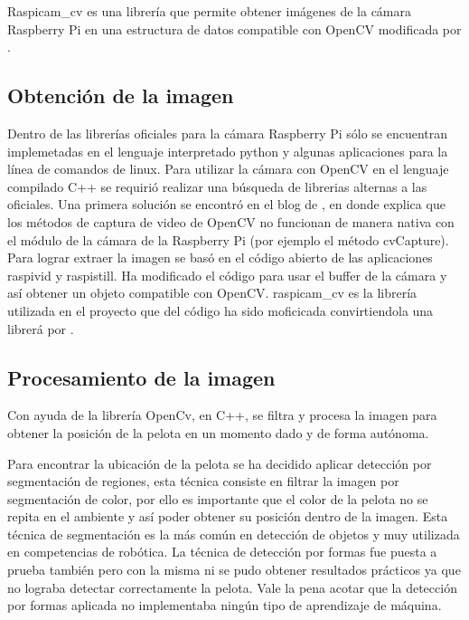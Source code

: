 Raspicam\_cv es una librería que permite obtener im\'agenes de la cámara Raspberry Pi en una estructura de datos compatible con OpenCV  modificada por \cite{emilV}.

\subsection{Obtenci\'on de la imagen}\label{extraerImagen}

Dentro de las librerías oficiales para la cámara Raspberry Pi s\'olo se encuentran implemetadas en el lenguaje interpretado python y algunas aplicaciones para la línea de comandos de linux. Para utilizar la cámara con OpenCV en el lenguaje compilado \gls{C++} se requirió realizar una búsqueda de librerias alternas a las oficiales. Una primera solución se encontró en el blog de \cite{pierreR}, en donde explica que los métodos de captura de video de OpenCV no funcionan de manera nativa con el m\'odulo de la cámara de la Raspberry Pi (por ejemplo el método cvCapture). Para lograr extraer la imagen se basó en el código abierto de las aplicaciones raspivid y raspistill. Ha modificado el código para usar el buffer de la cámara y así obtener un objeto compatible con OpenCV. 
raspicam\_cv es la librer\'ia utilizada en el proyecto que del c\'odigo ha sido moficicada convirtiendola una librer\'a por \cite{emilV}.

\subsection{Procesamiento de la imagen}\label{procesarImagen}

Con ayuda de la librería OpenCv, en \gls{C++}, se filtra y procesa la imagen para obtener la posición de la pelota en un momento dado y de forma autónoma. 

Para encontrar la ubicación de la pelota  se ha decidido aplicar detección por segmentación de regiones, esta técnica consiste en filtrar la imagen por segmentaci\'on de color, por ello es importante que el color de la pelota no se repita en el ambiente y así poder obtener su posición dentro de la imagen. Esta t\'ecnica de segmentaci\'on es la m\'as com\'un en detecci\'on de objetos y muy utilizada en competencias de rob\'otica. La t\'ecnica de detecci\'on por  formas fue puesta a prueba tambi\'en pero con la misma ni se pudo obtener resultados pr\'acticos ya que no lograba detectar correctamente la pelota. Vale la pena acotar que la detecci\'on por formas aplicada no implementaba ning\'un tipo de aprendizaje de m\'aquina.

